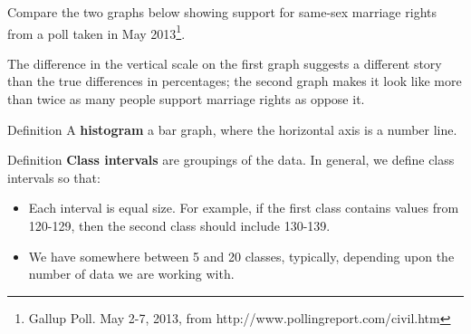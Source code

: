 \documentclass{beamer}
\begin{document}
\begin{frame}
\begin{example}
Compare the two graphs below showing support for same-sex marriage rights from a poll taken in May 2013\footnote[frame]{Gallup Poll. May 2-7, 2013, from http://www.pollingreport.com/civil.htm}. 

\hskip 1pt

The difference in the vertical scale on the first graph suggests a different story than the true differences in percentages; the second graph makes it look like more than twice as many people support marriage rights as oppose it.
\end{example}
\end{frame}

\begin{frame}
\begin{block}{Definition}
A \textbf{histogram} a bar graph, where the horizontal axis is a number line.
\end{block}\pause

\begin{block}{Definition}
\textbf{Class intervals} are groupings of the data. In general, we define class intervals so that:
\begin{itemize}
\item Each interval is equal size. For example, if the first class contains values from 120-129, then the second class should include 130-139.
\item We have somewhere between 5 and 20 classes, typically, depending upon the number of data we are working with.
\end{itemize}
\end{block}
\end{frame}
\end{document}
